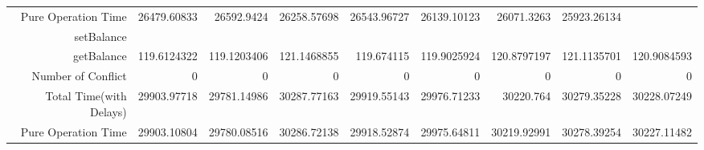 \begin{landscape}
\begin{table}[htbp]
\begin{tabular}{rrrrrrrrr}
    Pure Operation Time & 26479.60833 & 26592.9424 & 26258.57698 & 26543.96727 & 26139.10123 & 26071.3263 & 25923.26134 &  \\
    \cline{1-9}
    setBalance &       &       &       &       &       &       &       &  \\
    getBalance & 119.6124322 & 119.1203406 & 121.1468855 & 119.674115 & 119.9025924 & 120.8797197 & 121.1135701 & 120.9084593 \\
    Number of Conflict & 0     & 0     & 0     & 0     & 0     & 0     & 0     & 0 \\
    Total Time(with Delays) & 29903.97718 & 29781.14986 & 30287.77163 & 29919.55143 & 29976.71233 & 30220.764 & 30279.35228 & 30228.07249 \\
    Pure Operation Time & 29903.10804 & 29780.08516 & 30286.72138 & 29918.52874 & 29975.64811 & 30219.92991 & 30278.39254 & 30227.11482 \\
    \bottomrule
    \end{tabular}%
  \label{tab:reads RMIOnly}%
\end{table}%
\end{landscape}





